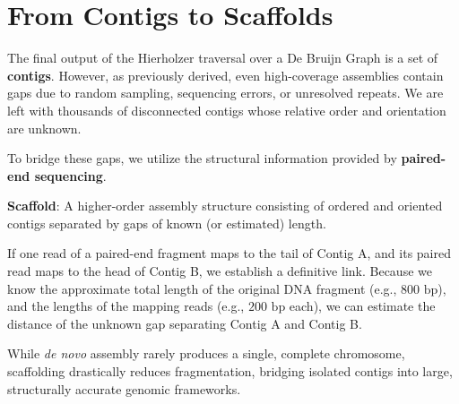 \section{From Contigs to Scaffolds}
The final output of the Hierholzer traversal over a De Bruijn Graph is a set of \textbf{contigs}. However, as previously derived, even high-coverage assemblies contain gaps due to random sampling, sequencing errors, or unresolved repeats. We are left with thousands of disconnected contigs whose relative order and orientation are unknown.

To bridge these gaps, we utilize the structural information provided by \textbf{paired-end sequencing}.

\begin{important}
    \textbf{Scaffold}: A higher-order assembly structure consisting of ordered and oriented contigs separated by gaps of known (or estimated) length.
\end{important}

If one read of a paired-end fragment maps to the tail of Contig A, and its paired read maps to the head of Contig B, we establish a definitive link. Because we know the approximate total length of the original DNA fragment (e.g., $800 \text{ bp}$), and the lengths of the mapping reads (e.g., $200 \text{ bp}$ each), we can estimate the distance of the unknown gap separating Contig A and Contig B. 

\sta While \textit{de novo} assembly rarely produces a single, complete chromosome, scaffolding drastically reduces fragmentation, bridging isolated contigs into large, structurally accurate genomic frameworks.
